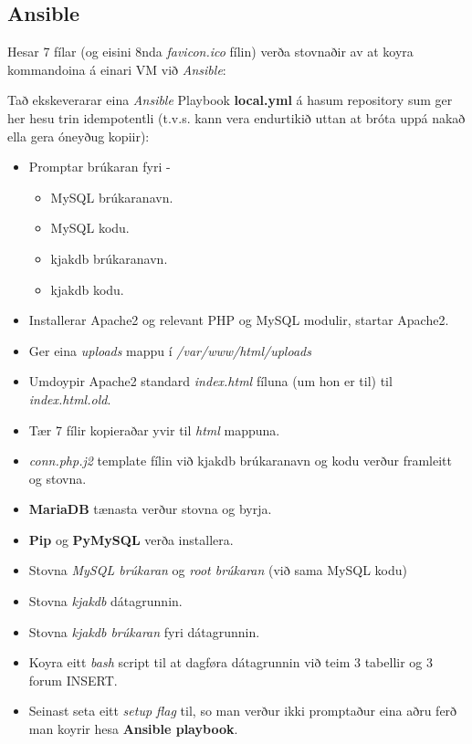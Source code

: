 \documentclass{article}
\begin{document}
\subsection{Ansible}
\par Hesar 7 fílar (og eisini 8nda \textit{favicon.ico} fílin) verða stovnaðir
av at koyra kommandoina á einari VM við \textit{Ansible}:
\newline
\newline
{}
\newline
\par Tað ekskeverarar eina \textit{Ansible} Playbook \textbf{local.yml} á hasum
repository sum ger her hesu trin idempotentli (t.v.s. kann vera endurtikið uttan at
bróta uppá nakað ella gera óneyðug kopiir):
\begin{itemize}
    \item Promptar brúkaran fyri -
    \begin{itemize}
        \item MySQL brúkaranavn.
        \item MySQL kodu.
        \item kjakdb brúkaranavn.
        \item kjakdb kodu.
    \end{itemize}
    \item Installerar Apache2 og relevant PHP og MySQL modulir, startar Apache2.
    \item Ger eina \textit{uploads} mappu í \textit{/var/www/html/uploads}
    \item Umdoypir Apache2 standard \textit{index.html} fíluna (um hon er til)
            til \textit{index.html.old}.
    \item Tær 7 fílir kopieraðar yvir til \textit{html} mappuna.
    \item \textit{conn.php.j2} template fílin við kjakdb brúkaranavn
            og kodu verður framleitt og stovna.
    \item \textbf{MariaDB} tænasta verður stovna og byrja.
    \item \textbf{Pip} og \textbf{PyMySQL} verða installera.
    \item Stovna \textit{MySQL brúkaran} og \textit{root brúkaran} (við sama MySQL kodu)
    \item Stovna \textit{kjakdb} dátagrunnin.
    \item Stovna \textit{kjakdb brúkaran} fyri dátagrunnin.
    \item Koyra eitt \textit{bash} script til at dagføra dátagrunnin
            við teim 3 tabellir og 3 forum INSERT.
    \item Seinast seta eitt \textit{setup flag} til, so man verður ikki promptaður eina
            aðru ferð man koyrir hesa \textbf{Ansible playbook}.
\end{itemize}
\end{document}
